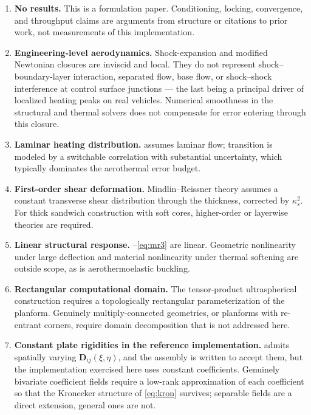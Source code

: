\documentclass[11pt,a4paper]{article}
\theoremstyle{definition}
\numberwithin{equation}{section}
\begin{document}
\begin{enumerate}
    \item \textbf{No results.} This is a formulation paper. Conditioning, locking, convergence, and throughput claims are arguments from structure or citations to prior work, not measurements of this implementation.

    \item \textbf{Engineering-level aerodynamics.} Shock-expansion and modified Newtonian closures are inviscid and local. They do not represent shock--boundary-layer interaction, separated flow, base flow, or shock--shock interference at control surface junctions --- the last being a principal driver of localized heating peaks on real vehicles. Numerical smoothness in the structural and thermal solvers does not compensate for error entering through this closure.

    \item \textbf{Laminar heating distribution.}  assumes laminar flow; transition is modeled by a switchable correlation with substantial uncertainty, which typically dominates the aerothermal error budget.

    \item \textbf{First-order shear deformation.} Mindlin--Reissner theory assumes a constant transverse shear distribution through the thickness, corrected by $\kappa_s^2$. For thick sandwich construction with soft cores, higher-order or layerwise theories are required.

    \item \textbf{Linear structural response.} --\cref{eq:mr3} are linear. Geometric nonlinearity under large deflection and material nonlinearity under thermal softening are outside scope, as is aerothermoelastic buckling.

    \item \textbf{Rectangular computational domain.} The tensor-product ultraspherical construction requires a topologically rectangular parameterization of the planform. Genuinely multiply-connected geometries, or planforms with re-entrant corners, require domain decomposition that is not addressed here.

    \item \textbf{Constant plate rigidities in the reference implementation.}  admits spatially varying $\mathbf{D}_{ij}(\xi,\eta)$, and the assembly is written to accept them, but the implementation exercised here uses constant coefficients. Genuinely bivariate coefficient fields require a low-rank approximation of each coefficient so that the Kronecker structure of \cref{eq:kron} survives; separable fields are a direct extension, general ones are not.


\end{enumerate}
\end{document}
